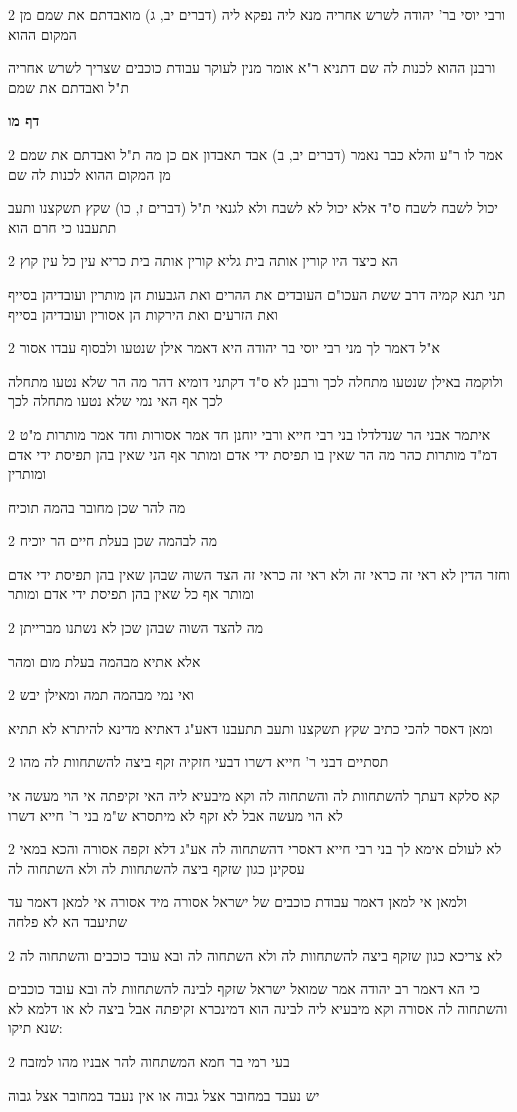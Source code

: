 \documentclass[12pt, openany]{book}
\newcommand{\sethebfont}{
\fontsize{10.5pt}{21.0pt} \selectfont
}
\newcommand{\twocol}[1]{
	{\sethebfont \begin{multicols}{2}
			#1
	\end{multicols}}	
}
\newcommand{\sectname}{}
\newcommand{\newsection}[1]{
	\addcontentsline{toc}{section}{#1}
	\renewcommand{\sectname}{#1}	
	\vspace{-\baselineskip}
	\begin{center}
		\textbf{%
\fontsize{16pt}{16pt}\selectfont
			#1}
	\end{center}
	\vspace{-\baselineskip}
	\nopagebreak
}
\begin{document}
\twocol{ורבי יוסי בר' יהודה לשרש אחריה מנא ליה נפקא ליה (דברים יב, ג) מואבדתם את שמם מן המקום ההוא
\par ורבנן ההוא לכנות לה שם דתניא ר"א אומר מנין לעוקר עבודת כוכבים שצריך לשרש אחריה ת"ל ואבדתם את שמם}
\newsection{דף מו}
\twocol{אמר לו ר"ע והלא כבר נאמר (דברים יב, ב) אבד תאבדון אם כן מה ת"ל ואבדתם את שמם מן המקום ההוא לכנות לה שם
\par יכול לשבח לשבח ס"ד אלא יכול לא לשבח ולא לגנאי ת"ל (דברים ז, כו) שקץ תשקצנו ותעב תתעבנו כי חרם הוא}
\twocol{הא כיצד היו קורין אותה בית גליא קורין אותה בית כריא עין כל עין קוץ
\par תני תנא קמיה דרב ששת העכו"ם העובדים את ההרים ואת הגבעות הן מותרין ועובדיהן בסייף ואת הזרעים ואת הירקות הן אסורין ועובדיהן בסייף}
\twocol{א"ל דאמר לך מני רבי יוסי בר יהודה היא דאמר אילן שנטעו ולבסוף עבדו אסור
\par ולוקמה באילן שנטעו מתחלה לכך ורבנן לא ס"ד דקתני דומיא דהר מה הר שלא נטעו מתחלה לכך אף האי נמי שלא נטעו מתחלה לכך}
\twocol{איתמר אבני הר שנדלדלו בני רבי חייא ורבי יוחנן חד אמר אסורות וחד אמר מותרות מ"ט דמ"ד מותרות כהר מה הר שאין בו תפיסת ידי אדם ומותר אף הני שאין בהן תפיסת ידי אדם ומותרין
\par מה להר שכן מחובר בהמה תוכיח}
\twocol{מה לבהמה שכן בעלת חיים הר יוכיח
\par וחזר הדין לא ראי זה כראי זה ולא ראי זה כראי זה הצד השוה שבהן שאין בהן תפיסת ידי אדם ומותר אף כל שאין בהן תפיסת ידי אדם ומותר}
\twocol{מה להצד השוה שבהן שכן לא נשתנו מברייתן
\par אלא אתיא מבהמה בעלת מום ומהר}
\twocol{ואי נמי מבהמה תמה ומאילן יבש
\par ומאן דאסר להכי כתיב שקץ תשקצנו ותעב תתעבנו דאע"ג דאתיא מדינא להיתרא לא תתיא}
\twocol{תסתיים דבני ר' חייא דשרו דבעי חזקיה זקף ביצה להשתחוות לה מהו
\par קא סלקא דעתך להשתחוות לה והשתחוה לה וקא מיבעיא ליה האי זקיפתה אי הוי מעשה אי לא הוי מעשה אבל לא זקף לא מיתסרא ש"מ בני ר' חייא דשרו}
\twocol{לא לעולם אימא לך בני רבי חייא דאסרי דהשתחוה לה אע"ג דלא זקפה אסורה והכא במאי עסקינן כגון שזקף ביצה להשתחוות לה ולא השתחוה לה
\par ולמאן אי למאן דאמר עבודת כוכבים של ישראל אסורה מיד אסורה אי למאן דאמר עד שתיעבד הא לא פלחה}
\twocol{לא צריכא כגון שזקף ביצה להשתחוות לה ולא השתחוה לה ובא עובד כוכבים והשתחוה לה
\par כי הא דאמר רב יהודה אמר שמואל ישראל שזקף לבינה להשתחוות לה ובא עובד כוכבים והשתחוה לה אסורה וקא מיבעיא ליה לבינה הוא דמינכרא זקיפתה אבל ביצה לא או דלמא לא שנא תיקו:}
\twocol{בעי רמי בר חמא המשתחוה להר אבניו מהו למזבח
\par יש נעבד במחובר אצל גבוה או אין נעבד במחובר אצל גבוה}
\end{document}
